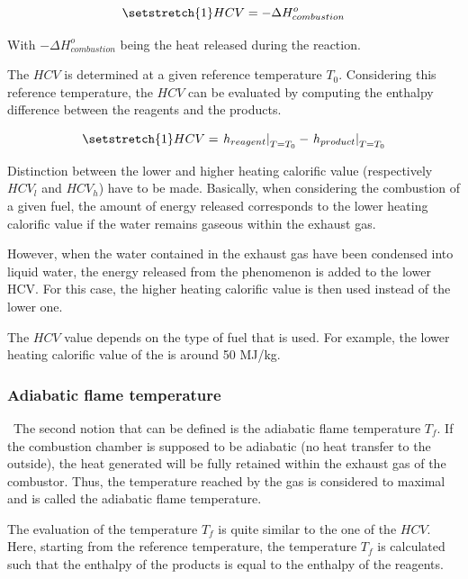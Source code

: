 \begin{equation}
    \setstretch{1}
    HCV = -\Delta H^o_{combustion} \label{eq:C4_HCV1}
\end{equation}

With \(-\Delta H^o_{combustion}\) being the heat released during the reaction.

The \(HCV\) is determined at a given reference temperature \(T_0\). Considering this reference temperature, the \(HCV\) can be evaluated by computing the enthalpy difference between the reagents and the products.

\begin{equation}
    \setstretch{1}
    HCV = \left.h_{reagent}\right|_{T=T_0} - \left.h_{product}\right|_{T=T_0}\label{eq:C4_HCV2}
\end{equation}

Distinction between the lower and higher heating calorific value (respectively $HCV_l$ and $HCV_h$) have to be made. Basically, when considering the combustion of a given fuel, the amount of energy released corresponds to the lower heating calorific value if the water remains gaseous within the exhaust gas. 

However, when the water contained in the exhaust gas have been condensed into liquid water, the energy released from the phenomenon is added to the lower HCV. For this case, the higher heating calorific value is then used instead of the lower one.  

The \(HCV\) value depends on the type of fuel that is used. For example, the lower heating calorific value of the  is around 50 MJ/kg.

\subsubsection{Adiabatic flame temperature}
\quad\ The second notion that can be defined is the adiabatic flame temperature \(T_f\). If the combustion chamber is supposed to be adiabatic (no heat transfer to the outside), the heat generated will be fully retained within the exhaust gas of the combustor. Thus, the temperature reached by the gas is considered to maximal and is called the adiabatic flame temperature.

The evaluation of the temperature \(T_f\) is quite similar to the one of the \(HCV\). Here, starting from the reference temperature, the temperature \(T_f\) is calculated such that the enthalpy of the products is equal to the enthalpy of the reagents.


